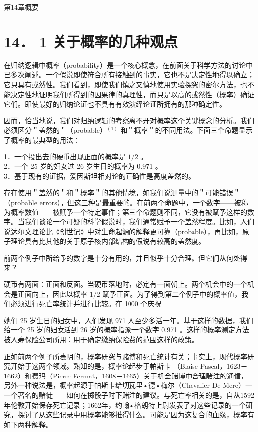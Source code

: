 第14章概要

\section*{14． 1 关于概率的几种观点}
在归纳逻辑中概率（probability）是一个核心概念，在前面关于科学方法的讨论中已多次阐述。一个假说即使符合所有接触到的事实，它也不是决定性地得以确立；它只具有或然性。我们看到，即使我们慎之又慎地使用实验探究的密尔方法，也不能决定性地证明我们所得到的因果律的真理性，而只是以高的或然性（概率）确证它们。即使最好的归纳论证也不具有有效演绎论证所拥有的那种确定性。

因而，恰当地说，我们对归纳逻辑的考察离不开对概率这个关键概念的分析。我们必须区分＂盖然的＂（probable）${ }^{(1)}$ 和＂概率＂的不同用法。下面三个命题显示了概率的最典型的用法：

1．一个投出去的硬币出现正面的概率是 $1 / 2$ 。\\
2．一个 25 岁的妇女过 26 岁生日的概率为 0.971 。\\
3．基于现有的证据，爱因斯坦相对论的正确性是高度盖然的。

存在使用＂盖然的＂和＂概率＂的其他情境，如我们说测量中的＂可能错误＂（probable errors），但这三种是最重要的。在前两个命题中，一个数字——被称为概率数值——被赋予一个特定事件；第三个命题则不同，它没有被赋予这样的数字。当我们谈论一个可疑的科学假说时，我们通常赋予一个盖然程度。比如，人们说达尔文理论比《创世记》中对生命起源的解释更可靠（probable），再比如，原子理论具有比其他的关于原子核内部结构的假说有较高的盖然度。

前两个例子中所给予的数字是十分有用的，并且似乎十分合理。但它们从何处得来？

硬币有两面：正面和反面。当硬币落地时，必定有一面朝上。两个机会中的一个机会是正面向上，因此以概率 $1 / 2$ 赋予正面。为了得到第二个例子中的概率值，我们必须进行死亡率统计并进行比较。在 1000 个庆祝

她们 25 岁生日的妇女中，人们发现 971 人至少多活一年。基于这样的数据，我们给一个 25 岁的妇女活到 26 岁的概率指派一个数字 0.971 。这样的概率测定方法被人寿保险公司所用：用于确定缴纳保险费的范围这样的政策。

正如前两个例子所表明的，概率研究与赌博和死亡统计有关；事实上，现代概率研究开始于这两个领域。熟知的是，概率论起步于帕斯卡 （Blaise Pascal，1623－1662）和费玛（Pierre Fermat，1608－1665）关于机会赌博中合理赌注的通信，另外一种说法是，概率起源于帕斯卡给切瓦里•德•梅尔（Chevalier De Mere）一一个著名的赌徒——如何在掷骰子时下赌注的建议。与死亡率相关的是，自从1592年伦敦开始保存死亡记录；1662年，约翰•格朗特上尉发表了对这些记录的一个研究，探讨了从这些记录中用概率能够推得什么。可能是因为这复合的血缘，概率有如下两种解释。

